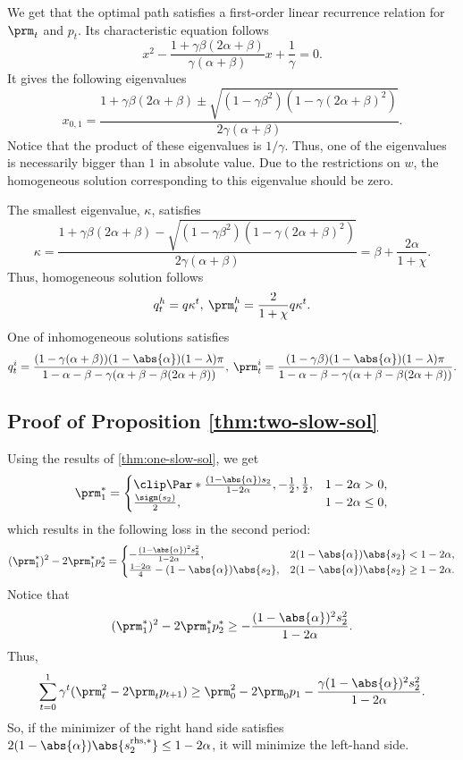 We get that the optimal path satisfies a first-order linear recurrence relation
for $\prm_t$ and $p_t$. Its characteristic equation follows
\[
    x^2 - \frac{1 + \gamma \beta (2 \alpha + \beta)}{\gamma (\alpha + \beta)} x
    + \frac{1}{\gamma} = 0.
\]
It gives the following eigenvalues
\[
    x_{0,1} = \frac{1 + \gamma \beta (2 \alpha + \beta) \pm
    \sqrt{(1 - \gamma \beta^2) (1 - \gamma (2 \alpha + \beta)^2)}}{2 \gamma
    (\alpha + \beta)}.
\]
Notice that the product of these eigenvalues is $1/\gamma$. Thus, one of the
eigenvalues is necessarily bigger than $1$ in absolute value. Due to the
restrictions on $w$, the homogeneous solution corresponding to this eigenvalue
should be zero.

The smallest eigenvalue, $\kappa$, satisfies
\[
    \kappa = \frac{1 + \gamma \beta (2 \alpha + \beta) - \sqrt{(1 - \gamma
    \beta^2) (1 - \gamma (2 \alpha + \beta)^2)}}{2 \gamma (\alpha + \beta)} =
    \beta + \frac{2 \alpha}{1 + \chi}.
\]
Thus, homogeneous solution follows
\[
    q^h_t = q \kappa^t, \: \prm^h_t = \frac{2}{1 + \chi} q \kappa^t.
\]
One of inhomogeneous solutions satisfies
\[
    q^i_t = \frac{(1 - \gamma (\alpha + \beta)) (1 - \abs{\alpha}) (1 -
    \lambda) \pi}{1 - \alpha - \beta - \gamma (\alpha + \beta - \beta (2
    \alpha + \beta))},\:
    \prm^i_t = \frac{(1 - \gamma \beta) (1 - \abs{\alpha}) (1 - \lambda)
    \pi}{1 - \alpha - \beta - \gamma (\alpha + \beta - \beta (2 \alpha +
    \beta))}.
\]


\subsection{Proof of Proposition \ref{thm:two-slow-sol}}
\label{sec:proof-two-slow-sol}

Using the results of \cref{thm:one-slow-sol}, we get
\[
    \prm^*_1 =
    \begin{cases}
        \clip\Par*{\frac{(1 - \abs{\alpha}) s_2}{1 - 2 \alpha}, -\frac{1}{2},
        \frac{1}{2}}, & 1 - 2 \alpha > 0,\\
        \frac{\sign(s_2)}{2}, & 1 - 2 \alpha \le 0,
    \end{cases}
\]
which results in the following loss in the second period:
\[
    (\prm^*_1)^2 - 2 \prm^*_1 p^*_2 =
    \begin{cases}
        -\frac{(1 - \abs{\alpha})^2 s_2^2}{1 - 2 \alpha},
        & 2 (1 - \abs{\alpha}) \abs{s_2} < 1 - 2 \alpha,\\
        \frac{1 - 2 \alpha}{4} - (1 - \abs{\alpha}) \abs{s_2},
        & 2 (1 - \abs{\alpha}) \abs{s_2} \ge 1 - 2 \alpha.
    \end{cases}
\]
Notice that
\[
    (\prm^*_1)^2 - 2 \prm^*_1 p^*_2 \ge - \frac{(1 - \abs{\alpha})^2 s_2^2}{1 -
    2 \alpha}.
\]
Thus,
\[
    \sum_{t=0}^1 \gamma^t (\prm_t^2 - 2 \prm_t p_{t+1}) \ge \prm_0^2 - 2
    \prm_0 p_1 - \frac{\gamma (1 - \abs{\alpha})^2 s_2^2}{1 - 2 \alpha}.
\]
So, if the minimizer of the right hand side satisfies $2 (1 - \abs{\alpha})
\abs{s^{\text{rhs}, *}_2} \le 1 - 2 \alpha$, it will minimize the left-hand
side.

